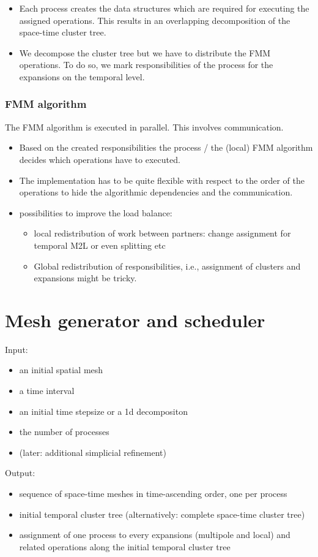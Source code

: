 \documentclass[a4paper,11pt]{article}
\theoremstyle{plain}
\theoremstyle{definition}
\theoremstyle{remark}
\begin{document}
\begin{itemize}
\item Each process creates the data structures which are required for executing the
  assigned operations. This results in an overlapping decomposition of the
  space-time cluster tree.
\item We decompose the cluster tree but we have to distribute the FMM operations.
  To do so, we mark responsibilities of the process for the expansions on the
  temporal level.
\end{itemize}

\subsubsection{FMM algorithm}
The FMM algorithm is executed in parallel. This involves communication.
\begin{itemize}
  \item Based on the created responsibilities the process / the (local) FMM algorithm
    decides which operations have to executed.   
\item The implementation has to be quite flexible with respect to the order of
  the operations to hide the algorithmic dependencies and the
  communication.
\item possibilities to improve the load balance:
  \begin{itemize}
   \item local redistribution of work between partners: change assignment for
     temporal M2L or even splitting etc 
   \item Global redistribution of responsibilities, i.e., assignment of clusters
     and expansions might be tricky.
  \end{itemize}
\end{itemize}


\section{Mesh generator and scheduler}

Input:
\begin{itemize}
\item  an initial spatial mesh
\item a time interval
\item an initial time stepsize or a 1d decompositon
\item the number of processes
\item (later: additional simplicial refinement)
\end{itemize}
Output:
\begin{itemize}
\item sequence of space-time meshes in time-ascending order, one per process
\item initial temporal cluster tree (alternatively: complete space-time cluster tree)
\item assignment of one process to every expansions (multipole and local) and
  related operations along the initial temporal cluster tree 
\end{itemize}
\end{document}
